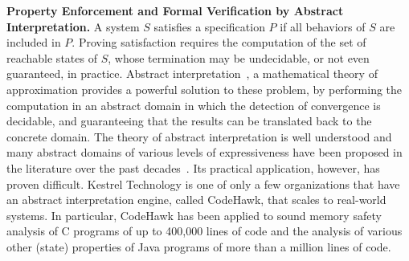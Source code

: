 \noindent\textbf{Property Enforcement and Formal Verification by Abstract Interpretation.} 
A system $S$ satisfies a specification $P$ if all behaviors of $S$ are
included in $P$. 
Proving satisfaction requires the computation of the set of reachable states of $S$, whose termination may be undecidable, or not even guaranteed, in practice. 
Abstract interpretation~\cite{Cousot77}, a mathematical theory of approximation
provides a powerful 
solution to these problem, by performing the computation in an
abstract domain in which the detection of convergence is decidable, and guaranteeing that the results can be translated back to the concrete domain. 
% 
%
The theory of abstract interpretation is well understood and many
abstract domains of various levels of expressiveness have been
proposed in the literature over the past decades~\cite{DBLP:journals/acta/Karr76,DBLP:conf/popl/CousotH78,DBLP:conf/popl/SankaranarayananSM04,DBLP:conf/vmcai/SankaranarayananSM05,DBLP:conf/vmcai/SankaranarayananCSM06}. Its practical
application, however, has proven difficult. Kestrel Technology is one
of only a few organizations that have an abstract interpretation
engine, called CodeHawk, that scales to real-world systems. In particular, CodeHawk has been
applied to sound memory safety analysis of C programs of up to 400,000
lines of code and the analysis of various other (state) properties of
Java programs of more than a million lines of code.

